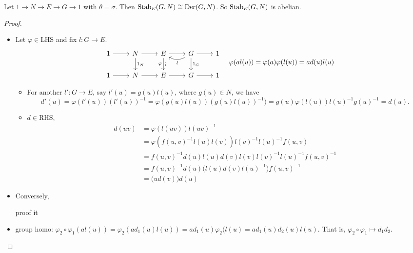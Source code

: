 \begin{theorem}
  Let $1\to N\to E\to G\to 1$ with $\theta = \sigma$. Then
  $\operatorname{Stab}_E(G, N) \cong \operatorname{Der}(G, N)$. So $\operatorname{Stab}_E(G, N)$ is abelian.
  \begin{proof} \mbox{}
    \begin{itemize}
      \item Let $\varphi \in \text{LHS}$ and fix $l:G\to E$.
        \[
          \begin{tikzcd}
            1 \arrow[r]
            & N \arrow[d, "1_N"] \arrow[r]
            & E \arrow[d, "\rotatebox{90}{\(\sim\)}", "\varphi"'] \arrow[r]
            & G \arrow[d, "1_G"] \arrow[r] \arrow[l, bend left, "l"]
            & 1 \\
            1 \arrow[r] & N \arrow[r] & E \arrow[r] & G \arrow[r] & 1
          \end{tikzcd}
          \quad \varphi(al(u)) = \varphi(a)\varphi(l(u)) = a d(u) l(u)
        \]
        \begin{itemize}
          \item For another $l':G\to E$, say $l'(u) = g(u)l(u)$, where
            $g(u) \in N$,
            we have
            \[ d'(u) = \varphi(l'(u))(l'(u))^{-1}
            = \varphi(g(u)l(u))(g(u)l(u))^{-1})
            = g(u)\varphi(l(u)) l(u)^{-1} g(u)^{-1} = d(u).
            \]

          \item $d \in \text{RHS}$, 
            \begin{align*}
              d(uv) &= \varphi(l(uv))l(uv)^{-1} \\
                    &= \varphi(f(u, v)^{-1} l(u)l(v)) l(v)^{-1} l(u)^{-1} f(u, v) \\
                    &= f(u, v)^{-1} d(u)l(u) d(v)l(v) l(v)^{-1} l(u)^{-1} f(u, v)^{-1} \\
                    &= f(u, v)^{-1} d(u) \big(l(u) d(v) l(u)^{-1}\big) f(u, v)^{-1} \\
                    &= \big(u d(v)\big) d(u)
            \end{align*}
        \end{itemize}

      \item Conversely, \begin{exercise} proof it \end{exercise}
      \item group homo:
        $\varphi_2\circ\varphi_1(al(u)) = \varphi_2(ad_1(u)l(u))
        = ad_1(u)\varphi_2(l(u) = a d_1(u) d_2(u) l(u)$.
        That is, $\varphi_2 \circ \varphi_1 \mapsto d_1 d_2$.
        \qedhere
    \end{itemize}
  \end{proof}
\end{theorem}

